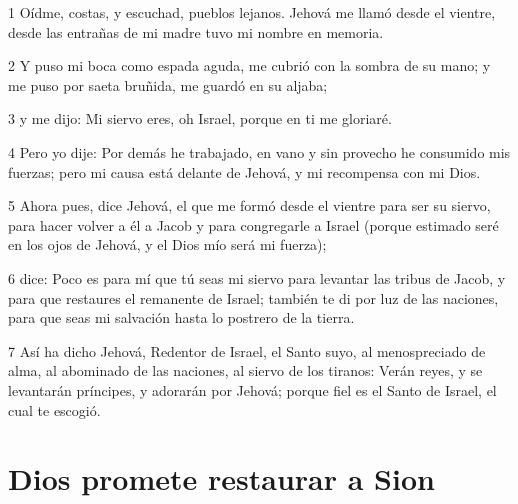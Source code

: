 \par 1 Oídme, costas, y escuchad, pueblos lejanos. Jehová me llamó desde el vientre, desde las entrañas de mi madre tuvo mi nombre en memoria.
\par 2 Y puso mi boca como espada aguda, me cubrió con la sombra de su mano; y me puso por saeta bruñida, me guardó en su aljaba;
\par 3 y me dijo: Mi siervo eres, oh Israel, porque en ti me gloriaré.
\par 4 Pero yo dije: Por demás he trabajado, en vano y sin provecho he consumido mis fuerzas; pero mi causa está delante de Jehová, y mi recompensa con mi Dios.
\par 5 Ahora pues, dice Jehová, el que me formó desde el vientre para ser su siervo, para hacer volver a él a Jacob y para congregarle a Israel (porque estimado seré en los ojos de Jehová, y el Dios mío será mi fuerza);
\par 6 dice: Poco es para mí que tú seas mi siervo para levantar las tribus de Jacob, y para que restaures el remanente de Israel; también te di por luz de las naciones, para que seas mi salvación hasta lo postrero de la tierra. 
\par 7 Así ha dicho Jehová, Redentor de Israel, el Santo suyo, al menospreciado de alma, al abominado de las naciones, al siervo de los tiranos: Verán reyes, y se levantarán príncipes, y adorarán por Jehová; porque fiel es el Santo de Israel, el cual te escogió.

\section*{Dios promete restaurar a Sion}

